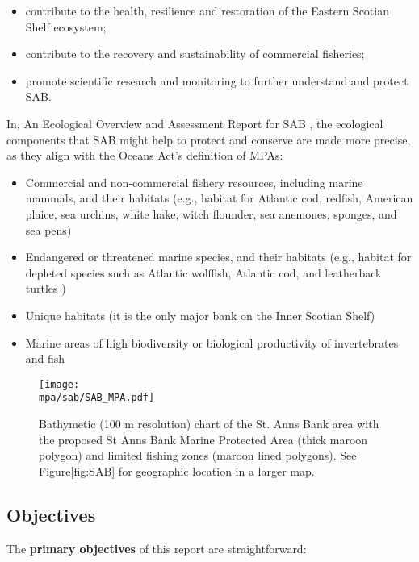 \documentclass[letterpaper,portrait,11pt]{scrartcl}
\numberwithin{equation}{section}		%
\numberwithin{figure}{section}		%
\numberwithin{table}{section}				%
\newcommand*{\D}{.}
\newcommand{\biodata}{\string~/bio\D data}   %
\newcommand{\mpa}{\biodata/bio\D indicators/mpa}  %
\begin{document}
\begin{itemize}
	\item contribute to the health, resilience and restoration of the Eastern Scotian Shelf ecosystem;
	\item contribute to the recovery and sustainability of commercial fisheries; 
	\item promote scientific research and monitoring to further understand and protect SAB.
\end{itemize}

In, An Ecological Overview and Assessment Report for SAB \parencite{Ford:2013:sab},  the ecological components that SAB might help to protect and conserve are made more precise, as they align with the Oceans Act's definition of MPAs:

\begin{itemize}
	\item Commercial and non-commercial fishery resources, including marine mammals, and their habitats (e.g., habitat for Atlantic cod, redfish, American plaice, sea urchins, white hake, witch flounder, sea anemones, sponges, and sea pens)
  \item Endangered or threatened marine species, and their habitats (e.g., habitat for depleted species such as Atlantic wolffish, Atlantic cod, and leatherback turtles )
  \item Unique habitats (it is the only major bank on the Inner Scotian Shelf)
  \item Marine areas of high biodiversity or biological productivity of invertebrates and fish
\end{itemize}

\begin{figure}[h]

  \centering
  \texttt{[image: \\mpa/sab/SAB\_MPA.pdf]}
  \caption{Bathymetic (100 m resolution) chart of the  St. Anns Bank area with the proposed St Anns Bank Marine Protected Area (thick maroon polygon) and limited fishing zones (maroon lined polygons). See Figure\ref{fig:SAB} for geographic location in a larger map.}
    \label{fig:SABCloseup}
\end{figure}

\subsection{Objectives}

The \textbf{primary objectives} of this report are straightforward:
\end{document}
